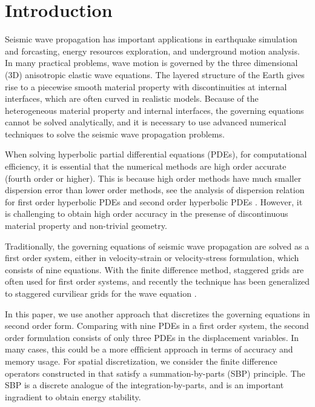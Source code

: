 \section{Introduction}
Seismic wave propagation has important applications in earthquake simulation and forcasting, energy resources exploration, and underground motion analysis. In many practical problems, wave motion is governed by the three dimensional (3D) anisotropic elastic wave equations. The layered structure of the Earth gives rise to a piecewise smooth material property with discontinuities at internal interfaces, which are often curved in realistic models. Because of the heterogeneous material property and internal interfaces, the governing equations cannot be solved analytically, and it is necessary to use advanced numerical techniques to solve the seismic wave propagation problems.

When solving hyperbolic partial differential equations (PDEs), for computational efficiency, it is essential that the numerical methods are high order accurate (fourth order or higher). This is because high order methods have much smaller dispersion error than lower order methods, see the analysis of dispersion relation for first order hyperbolic PDEs \cite{Kreiss1972} and second order hyperbolic PDEs \cite{Hagstrom2012}. However, it is challenging to obtain high order accuracy in the presense of discontinuous material property and non-trivial geometry. 

Traditionally, the governing equations of seismic wave propagation are solved as a first order system, either in velocity-strain or velocity-stress formulation, which consists of nine equations. With the finite difference method, staggered grids are often used for first order systems, and recently the technique has been generalized to staggered curviliear grids for the wave equation \cite{OReilly2020}.

In this paper, we use another approach that discretizes the governing equations in second order form. Comparing with nine PDEs in a first order system, the second order formulation consists of only three PDEs in the displacement variables. In many cases, this could be a more effficient approach in terms of accuracy and memory usage. For spatial discretization, we consider the finite difference operators constructed in \cite{sjogreen2012fourth} that satisfy a summation-by-parts (SBP) principle. The SBP is a discrete analogue of the integration-by-parts, and is an important ingradient to obtain energy stability. 

